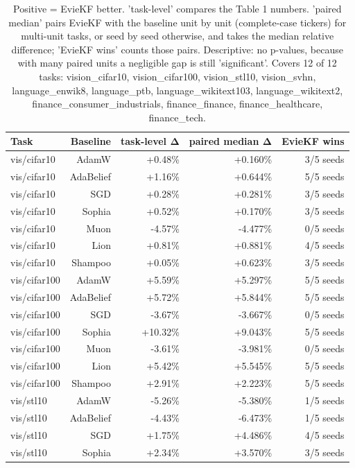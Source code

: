 \begin{table}[t]
\centering
\small
\caption{Positive = EvieKF better. 'task-level' compares the Table 1 numbers. 'paired median' pairs EvieKF with the baseline unit by unit (complete-case tickers) for multi-unit tasks, or seed by seed otherwise, and takes the median relative difference; 'EvieKF wins' counts those pairs. Descriptive: no p-values, because with many paired units a negligible gap is still 'significant'. Covers 12 of 12 tasks: vision\_cifar10, vision\_cifar100, vision\_stl10, vision\_svhn, language\_enwik8, language\_ptb, language\_wikitext103, language\_wikitext2, finance\_consumer\_industrials, finance\_finance, finance\_healthcare, finance\_tech.}
\label{tab:table4_evie_vs_baselines}
\begin{tabular}{lrrrr}
\toprule
Task & Baseline & task-level Δ & paired median Δ & EvieKF wins \\
\midrule
vis/cifar10 & AdamW & +0.48\% & +0.160\% & 3/5 seeds \\
vis/cifar10 & AdaBelief & +1.16\% & +0.644\% & 5/5 seeds \\
vis/cifar10 & SGD & +0.28\% & +0.281\% & 3/5 seeds \\
vis/cifar10 & Sophia & +0.52\% & +0.170\% & 3/5 seeds \\
vis/cifar10 & Muon & -4.57\% & -4.477\% & 0/5 seeds \\
vis/cifar10 & Lion & +0.81\% & +0.881\% & 4/5 seeds \\
vis/cifar10 & Shampoo & +0.05\% & +0.623\% & 3/5 seeds \\
vis/cifar100 & AdamW & +5.59\% & +5.297\% & 5/5 seeds \\
vis/cifar100 & AdaBelief & +5.72\% & +5.844\% & 5/5 seeds \\
vis/cifar100 & SGD & -3.67\% & -3.667\% & 0/5 seeds \\
vis/cifar100 & Sophia & +10.32\% & +9.043\% & 5/5 seeds \\
vis/cifar100 & Muon & -3.61\% & -3.981\% & 0/5 seeds \\
vis/cifar100 & Lion & +5.42\% & +5.545\% & 5/5 seeds \\
vis/cifar100 & Shampoo & +2.91\% & +2.223\% & 5/5 seeds \\
vis/stl10 & AdamW & -5.26\% & -5.380\% & 1/5 seeds \\
vis/stl10 & AdaBelief & -4.43\% & -6.473\% & 1/5 seeds \\
vis/stl10 & SGD & +1.75\% & +4.486\% & 4/5 seeds \\
vis/stl10 & Sophia & +2.34\% & +3.570\% & 3/5 seeds \\

\end{tabular}
\end{table}
